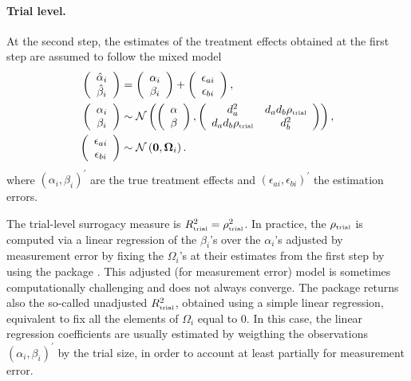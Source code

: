 \documentclass[article,shortnames, nojss]{jss}\usepackage[]{graphicx}\usepackage[]{color}
\begin{document}
\paragraph{Trial level.}
At the second step, the estimates of the treatment effects 
obtained at the first step are assumed to follow the mixed model
\begin{align}
\left(\begin{array}{c} 
{\hat\alpha_i}\\ {\hat\beta_i}\end{array}\right)
&= \left(\begin{array}{c} \alpha_i\\ \beta_i\end{array}\right) +
\left(\begin{array}{c} \epsilon_{ai}\\ \epsilon_{bi}\end{array}\right),\\
\left(\begin{array}{c} {\alpha_i}\\ {\beta_i}\end{array}\right)
& \sim \mathcal N
\left(
\left(\begin{array}{c}
\alpha\\ \beta\end{array}\right), 
\left(\begin{array}{cc} 
d_a^2 &
d_a d_b{\rho_\text{\tiny trial}} \\
d_a d_b{\rho_\text{\tiny trial}} &
d_b^2 \\
\end{array}\right)
\right),
\label{eq:trtEffs}\\
\left(\begin{array}{c} \epsilon_{ai}\\ \epsilon_{bi}\end{array}\right)
&\sim \mathcal N \left(
\bm 0, \bm\Omega_i \right).
\end{align}
where $(\alpha_i, \beta_i)^\prime$ are the true treatment effects
and $(\epsilon_{ai}, \epsilon_{bi})^\prime$ the estimation errors.

The trial-level surrogacy measure is
$R_\text{\tiny trial}^2 = \rho_\text{\tiny trial}^2$.
In practice, the $\rho_\text{\tiny trial}$ is computed
via a linear regression of the $\beta_i$'s over the $\alpha_i$'s
adjusted by measurement error by fixing the $\Omega_i$'s at their estimates
from the first step \citep{vanHouwelingenEtal02}
by using the  package \citep{GasparriniEtal12, R:mvmeta}.
This adjusted (for measurement error) model is sometimes computationally challenging
and does not always converge.
The  package returns also the so-called
unadjusted $R_\text{\tiny trial}^2$,
obtained using a simple linear regression,
equivalent to fix all the elements of $\Omega_i$ equal to 0.
In this case, the linear regression coefficients are usually estimated by
weigthing the observations $(\alpha_i, \beta_i)^\prime$ by the trial size,
in order to account at least partially for measurement error.
\end{document}
